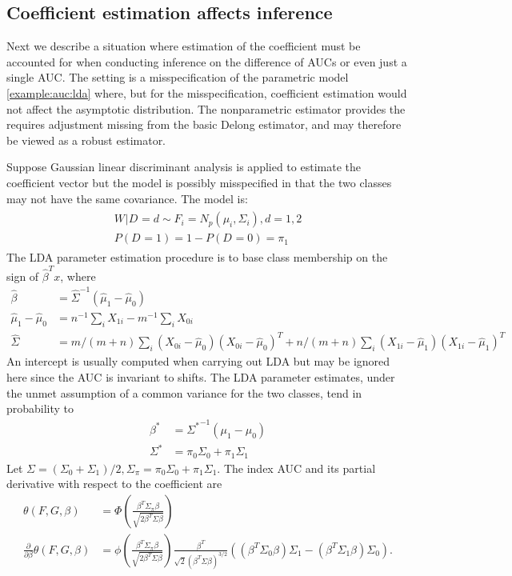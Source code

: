 \documentclass[12pt]{article}
\renewcommand{\P}{P}
\newcommand{\X}[1][]{X_{0#1}}
\newcommand{\Y}[1][]{X_{1#1}}
\newcommand{\W}[1][]{W_{#1}}
\newcommand{\D}[1][]{D_{#1}}
\renewcommand{\t}[1]{{#1}^T}
\renewcommand{\star}[1]{{#1}^\ast}
\newcommand{\F}{F}
\newcommand{\G}{G}
\newcommand{\m}{m}
\newcommand{\n}{n}
\newcommand{\N}{m+n}
\newcommand{\auc}{\theta}
\theoremstyle{definition}
\begin{document}
\subsection{Coefficient estimation affects inference}\label{section:lda}
Next we describe a situation where estimation of the coefficient must be
accounted for when conducting inference on the difference of AUCs or
even just a single AUC. The setting is a misspecification of the
parametric model \ref{example:auc:lda} where, but for the
misspecification, coefficient estimation would not affect the
asymptotic distribution. The nonparametric estimator provides the
requires adjustment missing from the basic Delong estimator, and may
therefore be viewed as a robust estimator.

Suppose Gaussian linear discriminant analysis is applied to estimate
the coefficient vector but the model is possibly misspecified in that
the two classes may not have the same covariance. The model is:
\begin{gather}
  \begin{aligned}\label{model:heteroskedastic lda}
    \W | \D=d \sim \F_i=N_p(\mu_i,\Sigma_i), d=1,2\\
    \P(\D=1)=1-P(\D=0)=\pi_1
  \end{aligned}
\end{gather}
The LDA parameter estimation procedure is to base class membership on
the sign of $\t{\hat\beta} x$, where
  \begin{align}
    \hat\beta&=\hat{\Sigma}^{-1}(\hat\mu_1-\hat\mu_0)\\
    \hat\mu_1-\hat\mu_0&=\n^{-1}\sum_i\Y[i] - \m^{-1}\sum_i\X[i]\\
    \hat\Sigma &= \m/(\N)\sum_i(\X[i]-\hat\mu_0)\t{(\X[i]-\hat\mu_0)} + \n/(\N)\sum_i(\Y[i]-\hat\mu_1)\t{(\Y[i]-\hat\mu_1)}
  \end{align}
  An intercept is usually computed when carrying out LDA but may be
  ignored here since the AUC is invariant to shifts. The LDA parameter
  estimates, under the unmet assumption of a common variance for the
  two classes, tend in probability to
  \begin{align}
    \star\beta &={\star{\Sigma}}^{-1}(\mu_1-\mu_0)\\
    \star\Sigma &= \pi_0\Sigma_0+\pi_1\Sigma_1
  \end{align}
  Let
  $\Sigma=(\Sigma_0+\Sigma_1)/2,\Sigma_\pi=\pi_0\Sigma_0+\pi_1\Sigma_1$.
  The index AUC and its partial derivative with respect to the
  coefficient are
  \begin{align}
    \auc(\F,\G,\beta) &= \Phi\left(\frac{\t\beta\Sigma_\pi\beta}{\sqrt{2\t\beta\Sigma\beta}}\right)\\
    \frac{\partial}{\partial\beta}\auc(\F,\G,\beta) &= \phi\left(\frac{\t\beta\Sigma_\pi\beta}{\sqrt{2\t\beta\Sigma\beta}}\right)\frac{\t\beta}{\sqrt{2}(\t\beta\Sigma\beta)^{3/2}}
                                                      ((\t\beta\Sigma_0\beta)\Sigma_1-(\t\beta\Sigma_1\beta)\Sigma_0).
  \end{align}
\end{document}
